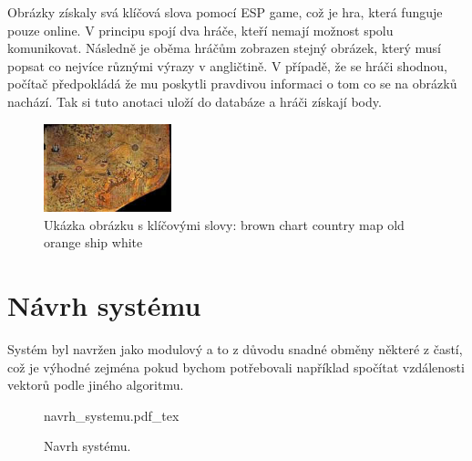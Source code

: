 \documentclass[czech,BP]{thesiskiv}
\begin{document}
\par Obrázky získaly svá klíčová slova pomocí ESP game, což je hra, která funguje pouze online. V principu spojí dva hráče, kteří nemají možnost spolu komunikovat. Následně je oběma hráčům zobrazen stejný obrázek, který musí popsat co nejvíce různými výrazy v angličtině. V případě, že se hráči shodnou, počítač předpokládá že mu poskytli pravdivou informaci o tom co se na obrázků nachází. Tak si tuto anotaci uloží do databáze a hráči získají body.

\begin{figure}[h]
		\centering
		\includegraphics[width=140px]{./img/esp.jpg}	
		\caption{Ukázka obrázku s klíčovými slovy: brown chart country map old orange ship white}
\end{figure}


\chapter{Návrh systému}
Systém byl navržen jako modulový a to z důvodu snadné obměny některé z častí, což je výhodné zejména pokud bychom potřebovali například spočítat vzdálenosti vektorů podle jiného algoritmu. 

 

\begin{figure}[ht]
    \centering
    \def\svgwidth{\columnwidth}
    {navrh_systemu.pdf_tex} 
    \caption{Navrh systému.}
\end{figure}
\end{document}
